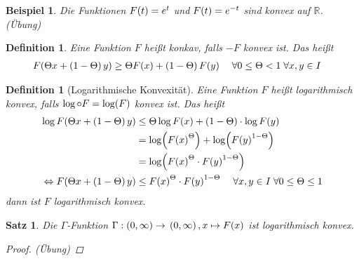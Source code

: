 \documentclass[11pt, twoside, a4paper]{article}
\theoremstyle{plain}
\newtheorem{definition}[blockelement]{Definition}
\newtheorem{satz}[blockelement]{Satz}
\newtheorem{beispiel}[blockelement]{Beispiel}
\numberwithin{equation}{subsection}
\newcommand{\pair}[1]{\left(#1\right)}
\newcommand{\of}[1]{\mathopen{}\mathclose{}\bgroup\left(#1\aftergroup\egroup\right)}
\newcommand{\equivalent}[0]{\Leftrightarrow{}}
\newcommand{\fromto}{\rightarrow{}}
\newcommand{\fa}{\;\forall}
\newcommand{\R}{\mathbb{R}}
\begin{document}
    \begin{beispiel}
        Die Funktionen $F\of{t} = e^{t}$ und $F\of{t} = e^{-t}$ sind konvex auf $\R$. (Übung)
    \end{beispiel}

    \begin{definition}
        Eine Funktion $F$ heißt konkav, falls $-F$ konvex ist. Das heißt
        \begin{align*}
            F\of{\Theta x + \pair{1-\Theta}y} &\geq \Theta F\of{x} + \pair{1-\Theta}F\of{y}\quad\fa 0\leq \Theta < 1\fa x,y\in I
        \end{align*}
    \end{definition}

    \begin{definition}[Logarithmische Konvexität]
        Eine Funktion $F$ heißt logarithmisch konvex, falls $\log \circ F = \log\of{F}$ konvex ist. Das heißt
        \begin{align*}
            \log F\of{\Theta x + \pair{1-\Theta} y} &\leq \Theta\log F\of{x} + \pair{1-\Theta}\cdot \log F\of{y}\\
            &= \log\of{F\of{x}^{\Theta}} + \log\of{F\of{y}^{1-\Theta}}\\
            &= \log\of{F\of{x}^{\Theta}\cdot F\of{y}^{1-\Theta}}\\
            \equivalent F\of{\Theta x + \pair{1-\Theta}y} &\leq F\of{x}^{\Theta} \cdot F\of{y}^{1-\Theta}\quad\fa x,y\in I\fa 0\leq \Theta \leq 1
        \end{align*}
        dann ist $F$ logarithmisch konvex.
    \end{definition}

    \begin{satz} %
        Die $\Gamma$-Funktion $\Gamma: \pair{0, \infty}\fromto \pair{0, \infty}, x\mapsto F\of{x}$ ist logarithmisch konvex.
        \begin{proof}
        (Übung)
        \end{proof}
    \end{satz}
\end{document}
